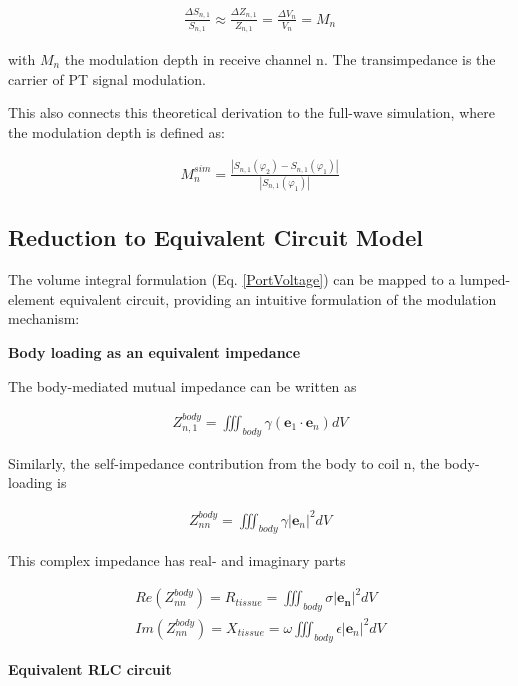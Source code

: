 \begin{align}
    \label{SParamCouplingSimplified}
    \frac{\Delta S_{n,1}}{S_{n,1}} \approx \frac{\Delta Z_{n,1}}{Z_{n,1}} = \frac{\Delta V_n}{V_n} = M_n
\end{align}

with $M_n$ the modulation depth in receive channel n. The transimpedance is the carrier of PT signal modulation.

This also connects this theoretical derivation to the full-wave simulation, where the modulation depth is defined as:

\begin{align}
    \label{TheoryToSim}
    M_n^{sim} = \frac{|S_{n,1}(\varphi_2) - S_{n,1}(\varphi_1)|}{|S_{n,1}(\varphi_1)|}
\end{align}


\subsection{Reduction to Equivalent Circuit Model}

The volume integral formulation (Eq. \eqref{PortVoltage}) can be mapped to a lumped-element equivalent circuit, providing an intuitive formulation of the modulation mechanism:

\textbf{Body loading as an equivalent impedance}

The body-mediated mutual impedance can be written as

\begin{align}
\label{mutImped}
    Z_{n,1}^{body} = \iiint_{body} \gamma (\mathbf{e}_1 \cdot \mathbf{e}_n) dV
\end{align}

Similarly, the self-impedance contribution from the body to coil n, the body-loading is

\begin{align}
\label{selfImped}
    Z_{nn}^{body} = \iiint_{body} \gamma |\mathbf{e}_n|^2dV
\end{align}

This complex impedance has real- and imaginary parts

\begin{align}
    Re(Z_{nn}^{body}) = R_{tissue} = \iiint_{body} \sigma|\mathbf{e_n}|^2dV \\
    Im(Z_{nn}^{body}) = X_{tissue} = \omega \iiint_{body} \epsilon |\mathbf{e}_n|^2dV
\end{align}

\textbf{Equivalent RLC circuit}

